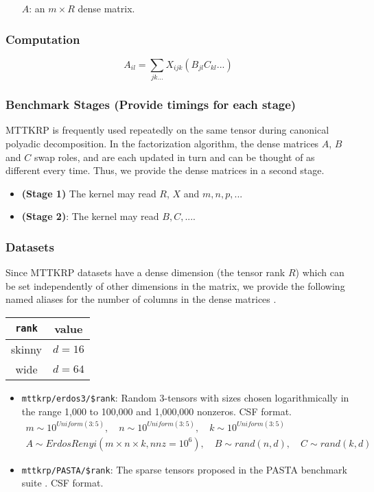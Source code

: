 \documentclass{article}
\begin{document}
\begin{itemize}
	\item[$A$:] an $m \times R$ dense matrix.
\end{itemize}

\subsubsection{Computation}

$$A_{il} = \sum_{jk...}X_{ijk}(B_{jl}C_{kl}...)$$

\subsubsection{Benchmark Stages (Provide timings for each stage)}

MTTKRP is frequently used repeatedly on the same tensor during canonical polyadic decomposition. In the factorization algorithm, the dense matrices $A$, $B$ and $C$ swap roles, and are each updated in turn and can be thought of as different every time. Thus, we provide the dense matrices in a second stage.

\begin{itemize}
\item \textbf{(Stage 1)}
	The kernel may read $R$, $X$ and $m, n, p, ...$
\item \textbf{(Stage 2)}:
	The kernel may read $B, C, ...$.
\end{itemize}

\subsubsection{Datasets}

	Since MTTKRP datasets have a dense dimension (the tensor rank $R$) which can be set independently
	of other dimensions in the matrix, we provide the following named aliases for the number of columns in the dense matrices \cite{kolda_tensor_2009,li_sparse_2020}.

    \begin{tabular}{|c|c|}\hline
        \texttt{rank} & value\\
        \hline
        skinny & $d = 16$\\
        wide & $d = 64$\\\hline
    \end{tabular}

\begin{itemize}
	\item \texttt{mttkrp/erdos3/\$rank}: Random 3-tensors with sizes chosen logarithmically in the range 1,000 to 100,000 and 1,000,000 nonzeros. CSF format.
	\begin{multline*}
		m \sim 10^{Uniform(3:5)}, \quad n \sim 10^{Uniform(3:5)}, \quad k \sim 10^{Uniform(3:5)}\\
			A \sim ErdosRenyi\left(m\times n \times k, nnz=10^6\right), \quad B \sim rand(n, d),  \quad C \sim rand(k, d)
	\end{multline*}
	\item \texttt{mttkrp/PASTA/\$rank}: The sparse tensors proposed in the PASTA benchmark suite \cite{li_pasta_2019}. CSF format.
\end{itemize}



\end{document}
